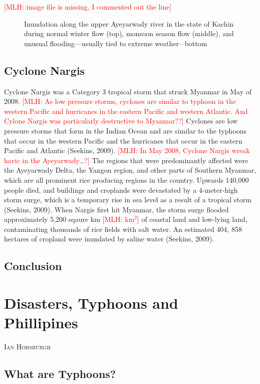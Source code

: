 \documentclass{book}\usepackage{knitr}
\makeatletter
\newcommand{\red}[1]{\textcolor{red}{[MLH: #1]}}
\newcommand{\chapterauthor}[1]{%
  {\parindent0pt\vspace*{-25pt}%
  \linespread{1.1}\large\scshape#1%
  \par\nobreak\vspace*{35pt}}
  \@afterheading%
}
\makeatother
\begin{document}
{\red{image file is missing, I commented out the line}
\begin{figure}
\caption{Inundation along the upper Ayeyarwady river in the state of Kachin during normal winter flow (top), monsoon season flow (middle), and unusual flooding—usually tied to extreme weather-- bottom}
\end{figure}

\section{Cyclone Nargis}
Cyclone Nargis was a Category 3 tropical storm that struck Myanmar in May of 2008. \red{As low pressure storms, cyclones are similar to typhoon in the western Pacific and hurricanes in the eastern Pacific and western Atlantic. And Cylone Nargis was particularly destructive to Myanmar??} Cyclones are low pressure storms that form in the Indian Ocean and are similar to the typhoons that occur in the western Pacific and the hurricanes that occur in the eastern Pacific and Atlantic (Seekins, 2009). \red{In May 2008, Cyclone Nargis wreak havic in the Ayeyarwady\ldots?} The regions that were predominantly affected were the Ayeyarwady Delta, the Yangon region, and other parts of Southern Myanmar, which are all prominent rice producing regions in the country. Upwards 140,000 people died, and buildings and croplands were devastated by a 4-meter-high storm surge, which is a temporary rise in sea level as a result of a tropical storm (Seekins, 2009). 
	When Nargis first hit Myanmar, the storm surge flooded approximately 5,200 sqaure km \red{km$^2$} of coastal land and low-lying land, contaminating thousands of rice fields with salt water. An estimated 404, 858 hectares of cropland were inundated by saline water (Seekins, 2009). 

\section{Conclusion}




\chapter{Disasters, Typhoons and Phillipines}

\chapterauthor{Ian Horsburgh}

\section{What are Typhoons?}



}
\end{document}
